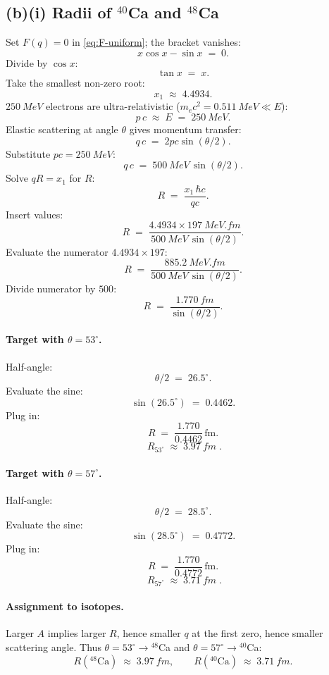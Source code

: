\documentclass[11pt]{article}
\begin{document}
\subsection*{(b)(i) Radii of $^{40}$Ca and $^{48}$Ca}

Set $F(q)=0$ in \eqref{eq:F-uniform}; the bracket vanishes:
\[
x\cos x-\sin x\;=\;0.
\]
Divide by $\cos x$:
\[
\tan x\;=\;x.
\]
Take the smallest non-zero root:
\[
x_{1}\;\approx\;4.4934.
\]
$\SI{250}{MeV}$ electrons are ultra-relativistic ($m_{e}c^{2}=\SI{0.511}{MeV}\ll E$):
\[
p\,c\;\approx\;E\;=\;\SI{250}{MeV}.
\]
Elastic scattering at angle $\theta$ gives momentum transfer:
\[
q\,c\;=\;2pc\sin(\theta/2).
\]
Substitute $pc=\SI{250}{MeV}$:
\[
q\,c\;=\;\SI{500}{MeV}\,\sin(\theta/2).
\]
Solve $qR=x_{1}$ for $R$:
\[
R\;=\;\frac{x_{1}\,\hbar c}{qc}.
\]
Insert values:
\[
R\;=\;\frac{4.4934\times \SI{197}{MeV.fm}}{\SI{500}{MeV}\,\sin(\theta/2)}.
\]
Evaluate the numerator $4.4934\times 197$:
\[
R\;=\;\frac{\SI{885.2}{MeV.fm}}{\SI{500}{MeV}\,\sin(\theta/2)}.
\]
Divide numerator by $500$:
\[
R\;=\;\frac{\SI{1.770}{fm}}{\sin(\theta/2)}.
\]

\paragraph{Target with $\theta=53^{\circ}$.}
Half-angle:
\[
\theta/2\;=\;26.5^{\circ}.
\]
Evaluate the sine:
\[
\sin(26.5^{\circ})\;=\;0.4462.
\]
Plug in:
\[
R\;=\;\frac{1.770}{0.4462}\,\text{fm}.
\]
\begin{equation}
\boxed{\;R_{53^{\circ}}\;\approx\;\SI{3.97}{fm}\;.}
\label{eq:R53}
\end{equation}

\paragraph{Target with $\theta=57^{\circ}$.}
Half-angle:
\[
\theta/2\;=\;28.5^{\circ}.
\]
Evaluate the sine:
\[
\sin(28.5^{\circ})\;=\;0.4772.
\]
Plug in:
\[
R\;=\;\frac{1.770}{0.4772}\,\text{fm}.
\]
\begin{equation}
\boxed{\;R_{57^{\circ}}\;\approx\;\SI{3.71}{fm}\;.}
\label{eq:R57}
\end{equation}

\paragraph{Assignment to isotopes.} Larger $A$ implies larger $R$, hence smaller $q$ at the first zero, hence smaller scattering angle. Thus $\theta=53^{\circ}\to{}^{48}$Ca and $\theta=57^{\circ}\to{}^{40}$Ca:
\[
R(^{48}\!\text{Ca})\;\approx\;\SI{3.97}{fm},\qquad R(^{40}\!\text{Ca})\;\approx\;\SI{3.71}{fm}.
\]
\end{document}
